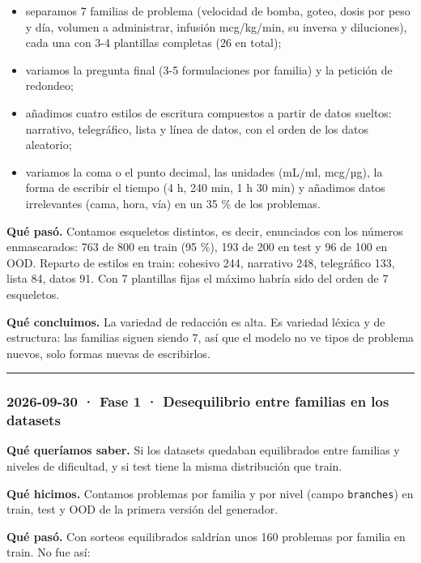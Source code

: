 \begin{itemize}
\tightlist
\item
  separamos 7 familias de problema (velocidad de bomba, goteo, dosis por peso y día, volumen a
  administrar, infusión mcg/kg/min, su inversa y diluciones), cada una con 3-4 plantillas
  completas (26 en total);
\item
  variamos la pregunta final (3-5 formulaciones por familia) y la petición de redondeo;
\item
  añadimos cuatro estilos de escritura compuestos a partir de datos sueltos: narrativo,
  telegráfico, lista y línea de datos, con el orden de los datos aleatorio;
\item
  variamos la coma o el punto decimal, las unidades (mL/ml, mcg/µg), la forma de escribir el
  tiempo (4 h, 240 min, 1 h 30 min) y añadimos datos irrelevantes (cama, hora, vía) en un 35 \%
  de los problemas.
\end{itemize}

\textbf{Qué pasó.} Contamos esqueletos distintos, es decir, enunciados con los números
enmascarados: 763 de 800 en train (95 \%), 193 de 200 en test y 96 de 100 en OOD. Reparto de
estilos en train: cohesivo 244, narrativo 248, telegráfico 133, lista 84, datos 91. Con 7
plantillas fijas el máximo habría sido del orden de 7 esqueletos.

\textbf{Qué concluimos.} La variedad de redacción es alta. Es variedad léxica y de estructura: las
familias siguen siendo 7, así que el modelo no ve tipos de problema nuevos, solo formas nuevas
de escribirlos.

\begin{center}\rule{0.5\linewidth}{0.5pt}\end{center}

\subsubsection{2026-09-30 · Fase 1 · Desequilibrio entre familias en los datasets}

\textbf{Qué queríamos saber.} Si los datasets quedaban equilibrados entre familias y niveles de
dificultad, y si test tiene la misma distribución que train.

\textbf{Qué hicimos.} Contamos problemas por familia y por nivel (campo \texttt{branches}) en train, test y
OOD de la primera versión del generador.

\textbf{Qué pasó.} Con sorteos equilibrados saldrían unos 160 problemas por familia en train. No fue
así:


